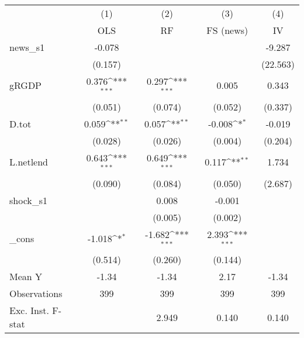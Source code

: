 {
\def\sym#1{\ifmmode^{#1}\else\(^{#1}\)\fi}
\begin{tabular}{l*{4}{c}}
\toprule
            &\multicolumn{1}{c}{(1)}&\multicolumn{1}{c}{(2)}&\multicolumn{1}{c}{(3)}&\multicolumn{1}{c}{(4)}\\
            &\multicolumn{1}{c}{OLS}&\multicolumn{1}{c}{RF}&\multicolumn{1}{c}{FS (news)}&\multicolumn{1}{c}{IV}\\
\midrule
news\_s1     &      -0.078         &                     &                     &      -9.287         \\
            &     (0.157)         &                     &                     &    (22.563)         \\
\addlinespace
gRGDP       &       0.376\sym{***}&       0.297\sym{***}&       0.005         &       0.343         \\
            &     (0.051)         &     (0.074)         &     (0.052)         &     (0.337)         \\
\addlinespace
D.tot       &       0.059\sym{**} &       0.057\sym{**} &      -0.008\sym{*}  &      -0.019         \\
            &     (0.028)         &     (0.026)         &     (0.004)         &     (0.204)         \\
\addlinespace
L.netlend   &       0.643\sym{***}&       0.649\sym{***}&       0.117\sym{**} &       1.734         \\
            &     (0.090)         &     (0.084)         &     (0.050)         &     (2.687)         \\
\addlinespace
shock\_s1    &                     &       0.008         &      -0.001         &                     \\
            &                     &     (0.005)         &     (0.002)         &                     \\
\addlinespace
\_cons      &      -1.018\sym{*}  &      -1.682\sym{***}&       2.393\sym{***}&                     \\
            &     (0.514)         &     (0.260)         &     (0.144)         &                     \\
\midrule
Mean Y      &       -1.34         &       -1.34         &        2.17         &       -1.34         \\
Observations&         399         &         399         &         399         &         399         \\
Exc. Inst. F-stat&                     &       2.949         &       0.140         &       0.140         \\
\bottomrule
\end{tabular}
}
